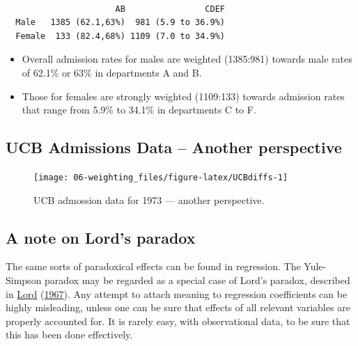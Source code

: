 \documentclass[
  10pt,
  b5paper]{book}
\providecommand{\tightlist}{%
  \setlength{\itemsep}{0pt}\setlength{\parskip}{0pt}}
\begin{document}
\begin{verbatim}
        
                      AB                CDEF
  Male   1385 (62.1,63%)  981 (5.9 to 36.9%)
  Female  133 (82.4,68%) 1109 (7.0 to 34.9%)
\end{verbatim}

\begin{itemize}
\tightlist
\item
  Overall admission rates for males are weighted (1385:981) towards
  male rates of 62.1\% or 63\% in departments A and B.
\item
  Those for females are strongly weighted (1109:133) towards admission rates that range from 5.9\% to 34.1\% in departments C to F.
\end{itemize}

\hypertarget{ucb-admissions-data-another-perspective}{%
\subsection*{UCB Admissions Data -- Another perspective}\label{ucb-admissions-data-another-perspective}}

\begin{figure}[H]

{\centering \texttt{[image: 06-weighting\_files/figure-latex/UCBdiffs-1]} 

}

\caption{UCB admossion data for 1973 --- another perspective.}\label{fig:UCBdiffs}
\end{figure}

\hypertarget{a-note-on-lords-paradox}{%
\subsection*{A note on Lord's paradox}\label{a-note-on-lords-paradox}}

The same sorts of paradoxical effects can be found in regression.
The Yule-Simpson paradox may be regarded as a special case of Lord's
paradox, described in \protect\hyperlink{ref-lord1967paradox}{Lord} (\protect\hyperlink{ref-lord1967paradox}{1967}). Any attempt to attach meaning
to regression coefficients can be highly misleading, unless one can be
sure that effects of all relevant variables are properly
accounted for. It is rarely easy, with observational data, to be sure
that this has been done effectively.
\end{document}
